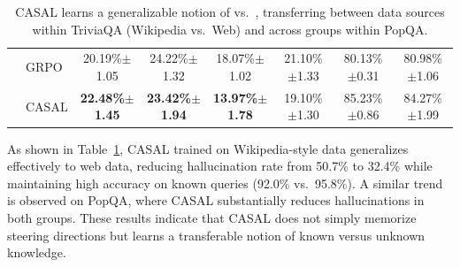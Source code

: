 \begin{table}[htbp]
{\begin{tabular}{l l c c c c c c}
& GRPO  & 20.19\%$\pm$1.05 & 24.22\%$\pm$1.32 & 18.07\%$\pm$1.02 & 21.10\%$\pm$1.33 & 80.13\%$\pm$0.31 & 80.98\%$\pm$1.06 \\
& CASAL  & \textbf{22.48\%$\pm$1.45} & \textbf{23.42\%$\pm$1.94} & \textbf{13.97\%$\pm$1.78} & 19.10\%$\pm$1.30 & 85.23\%$\pm$0.86 & 84.27\%$\pm$1.99 \\
\bottomrule
\end{tabular}}
\caption[CASAL generalizes across data sources and groups]{CASAL learns a generalizable notion of  vs.\ , transferring between data sources within TriviaQA (Wikipedia vs.\ Web) and across groups within PopQA.}
\label{tab:generalization_within}
\end{table}

As shown in Table~\ref{tab:generalization_within}, CASAL trained on Wikipedia-style data generalizes effectively to web data, reducing hallucination rate from 50.7\% to 32.4\% while maintaining high accuracy on known queries (92.0\% vs.\ 95.8\%). A similar trend is observed on PopQA, where CASAL substantially reduces hallucinations in both groups. These results indicate that CASAL does not simply memorize steering directions but learns a transferable notion of known versus unknown knowledge.

